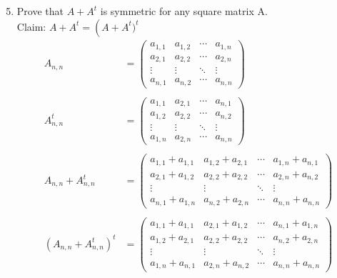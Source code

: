 \documentclass[letterpaper,12pt]{article}
\newcommand{\?}{\stackrel{?}{=}}
\begin{document}
\begin{spacing}{1.5}
\begin{enumerate}
\end{enumerate}
\newpage{}
\subsection{}
\begin{enumerate}
\setcounter{enumi}{4}
\item Prove that $A + A^t$ is symmetric for any square matrix A. 
\\
Claim: $A+A^t = \left(A + A^t)^t$
\begin{align*}
 A_{n,n} &=
 \begin{pmatrix}
  a_{1,1} & a_{1,2} & \cdots & a_{1,n} \\
  a_{2,1} & a_{2,2} & \cdots & a_{2,n} \\
  \vdots  & \vdots  & \ddots & \vdots  \\
  a_{n,1} & a_{n,2} & \cdots & a_{n,n}
 \end{pmatrix}
\\
\\ A^t_{n,n} &=
 \begin{pmatrix}
  a_{1,1} & a_{2,1} & \cdots & a_{n,1} \\
  a_{1,2} & a_{2,2} & \cdots & a_{n,2} \\
  \vdots  & \vdots  & \ddots & \vdots  \\
  a_{1,n} & a_{2,n} & \cdots & a_{n,n}
 \end{pmatrix}
\\
 \\A_{n,n} + A^t_{n,n} &=
 \begin{pmatrix}
  a_{1,1}+a_{1,1} & a_{1,2} + a_{2,1} & \cdots & a_{1,n} + a_{n,1} \\
  a_{2,1} + a_{1,2} & a_{2,2} + a_{2,2} & \cdots & a_{2,n} + a_{n,2}  \\
  \vdots  & \vdots  & \ddots & \vdots  \\
  a_{n,1} + a_{1,n}  & a_{n,2} + a_{2,n} & \cdots & a_{n,n} + a_{n,n}
 \end{pmatrix}
\\
\\ \left(A_{n,n} + A^t_{n,n}\right)^t &=
 \begin{pmatrix}
  a_{1,1}+a_{1,1} & a_{2,1} + a_{1,2} & \cdots & a_{n,1} + a_{1,n} \\
  a_{1,2} + a_{2,1} & a_{2,2} + a_{2,2} & \cdots & a_{n,2} + a_{2,n}  \\
  \vdots  & \vdots  & \ddots & \vdots  \\
  a_{1,n} + a_{n,1}  & a_{2,n} + a_{n,2} & \cdots & a_{n,n} + a_{n,n}

\end{pmatrix}
\end{align*}
\end{enumerate}
\end{spacing}
\end{document}
